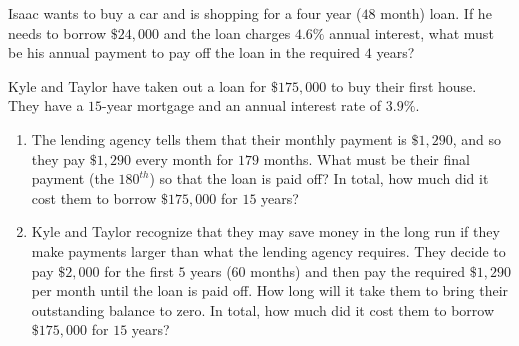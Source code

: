 \documentclass[10pt,]{book}
\theoremstyle{ptxdefinitionnotitle}
\theoremstyle{ptxdefinitiontitle}
\theoremstyle{ptxdefinitionnotitle}
\theoremstyle{ptxdefinitiontitle}
\theoremstyle{ptxdefinitionnotitle}
\theoremstyle{ptxdefinitiontitle}
\numberwithin{equation}{section}
\begin{document}
\begin{divisionexercise}{4}\hypertarget{exercise-15}{}
\hypertarget{p-63}{}%
Isaac wants to buy a car and is shopping for a four year (\(48\) month) loan. If he needs to borrow \(\$24,000\) and the loan charges \(4.6\%\) annual interest, what must be his annual payment to pay off the loan in the required \(4\) years?%
\end{divisionexercise}%
\begin{divisionexercise}{5}\hypertarget{exercise-16}{}
\hypertarget{p-64}{}%
Kyle and Taylor have taken out a loan for \(\$175,000\) to buy their first house. They have a \(15\)-year mortgage and an annual interest rate of \(3.9\%\).%
\leavevmode%
\begin{enumerate}[label=(\alph*)]
\item\hypertarget{li-52}{}The lending agency tells them that their monthly payment is \(\$1,290\), and so they pay \(\$1,290\) every month for \(179\) months. What must be their final payment (the \(180^{th}\)) so that the loan is paid off?  In total, how much did it cost them to borrow \(\$175,000\) for \(15\) years?%
\item\hypertarget{li-53}{}Kyle and Taylor recognize that they may save money in the long run if they make payments larger than what the lending agency requires. They decide to pay \(\$2,000\) for the first \(5\) years (\(60\) months) and then pay the required \(\$1,290\) per month until the loan is paid off. How long will it take them to bring their outstanding balance to zero. In total, how much did it cost them to borrow \(\$175,000\) for \(15\) years?%
\end{enumerate}
\end{divisionexercise}%
\end{document}
